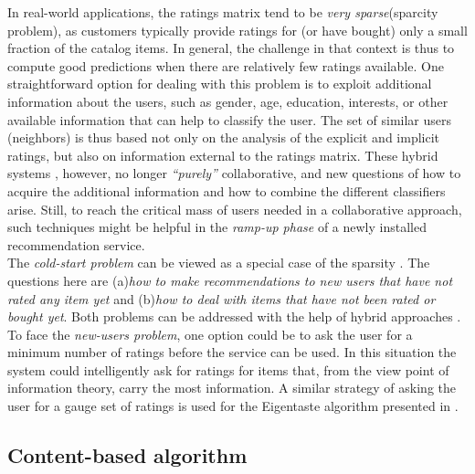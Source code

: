 In real-world applications, the ratings matrix tend to be \textit{very
sparse}(sparcity problem), as customers typically provide  ratings
for (or have bought) only a small fraction of the catalog items. In
general, the challenge in that context is thus to compute good
predictions when there are relatively few ratings available. One
straightforward option for dealing with this problem is to exploit
additional information about the users, such as gender, age,
education, interests, or other available information that can help to
classify the user. The set of similar users (neighbors) is thus based
not only on the analysis of the explicit and implicit ratings, but
also on information external to the ratings matrix. These hybrid
systems \cite{pazzani2007content}, however, no longer
\textit{“purely”} collaborative, and new questions of how to acquire
the additional information and how to combine the different
classifiers arise. Still, to reach the critical mass of users needed
in a collaborative approach, such techniques might be helpful in the
\textit{ramp-up phase} of a newly installed recommendation service. \\
The \textit{cold-start problem} can be viewed as a special case of the
sparsity \cite{huang2004applying}. The questions here are (a)\textit{how 
to make recommendations to new users that have not rated
any item yet} and (b)\textit{how to deal with items that have not
been rated or bought yet}. Both problems can be addressed with the
help of hybrid approaches \cite{adomavicius2005toward}.  To face the
\textit{new-users problem}, one option could be to ask the user for a
minimum number of ratings before the service can be used. In this
situation the system could intelligently ask for ratings for items
that, from the view point of information theory, carry the most
information\cite{rashid2002getting}. A similar strategy of asking
the user for a gauge set of ratings is used for the Eigentaste
algorithm presented in \cite{goldberg2001eigentaste}.

\subsection{Content-based algorithm}


